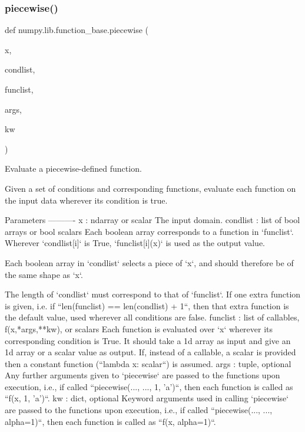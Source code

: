 \subsubsection{\texorpdfstring{piecewise()}{piecewise()}}
{\footnotesize\ttfamily def numpy.\+lib.\+function\+\_\+base.\+piecewise (\begin{DoxyParamCaption}\item[{}]{x,  }\item[{}]{condlist,  }\item[{}]{funclist,  }\item[{}]{args,  }\item[{}]{kw }\end{DoxyParamCaption})}

\begin{DoxyVerb}Evaluate a piecewise-defined function.

Given a set of conditions and corresponding functions, evaluate each
function on the input data wherever its condition is true.

Parameters
----------
x : ndarray or scalar
    The input domain.
condlist : list of bool arrays or bool scalars
    Each boolean array corresponds to a function in `funclist`.  Wherever
    `condlist[i]` is True, `funclist[i](x)` is used as the output value.

    Each boolean array in `condlist` selects a piece of `x`,
    and should therefore be of the same shape as `x`.

    The length of `condlist` must correspond to that of `funclist`.
    If one extra function is given, i.e. if
    ``len(funclist) == len(condlist) + 1``, then that extra function
    is the default value, used wherever all conditions are false.
funclist : list of callables, f(x,*args,**kw), or scalars
    Each function is evaluated over `x` wherever its corresponding
    condition is True.  It should take a 1d array as input and give an 1d
    array or a scalar value as output.  If, instead of a callable,
    a scalar is provided then a constant function (``lambda x: scalar``) is
    assumed.
args : tuple, optional
    Any further arguments given to `piecewise` are passed to the functions
    upon execution, i.e., if called ``piecewise(..., ..., 1, 'a')``, then
    each function is called as ``f(x, 1, 'a')``.
kw : dict, optional
    Keyword arguments used in calling `piecewise` are passed to the
    functions upon execution, i.e., if called
    ``piecewise(..., ..., alpha=1)``, then each function is called as
    ``f(x, alpha=1)``.


\end{DoxyVerb}
